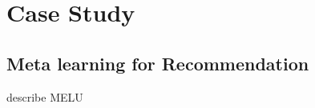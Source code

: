 \section{Case Study}
\subsection{Meta learning for Recommendation}

describe MELU\cite{lee2019melu}

